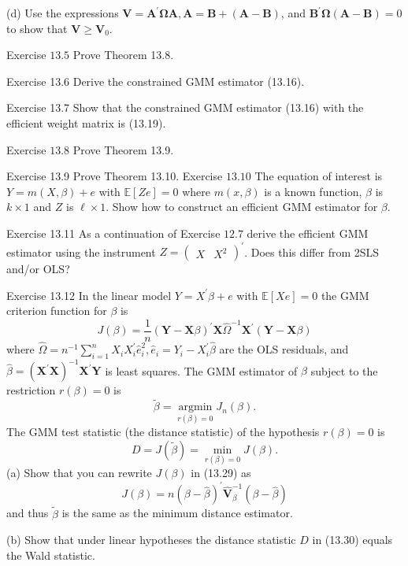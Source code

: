 \documentclass[10pt]{article}
\begin{document}
(d) Use the expressions $\boldsymbol{V}=\boldsymbol{A}^{\prime} \mathbf{\Omega} \boldsymbol{A}, \boldsymbol{A}=\boldsymbol{B}+(\boldsymbol{A}-\boldsymbol{B})$, and $\boldsymbol{B}^{\prime} \boldsymbol{\Omega}(\boldsymbol{A}-\boldsymbol{B})=0$ to show that $\boldsymbol{V} \geq \boldsymbol{V}_{0}$.

Exercise $13.5$ Prove Theorem 13.8.

Exercise 13.6 Derive the constrained GMM estimator (13.16).

Exercise 13.7 Show that the constrained GMM estimator (13.16) with the efficient weight matrix is (13.19).

Exercise $13.8$ Prove Theorem 13.9.

Exercise 13.9 Prove Theorem 13.10. Exercise $13.10$ The equation of interest is $Y=m(X, \beta)+e$ with $\mathbb{E}[Z e]=0$ where $m(x, \beta)$ is a known function, $\beta$ is $k \times 1$ and $Z$ is $\ell \times 1$. Show how to construct an efficient GMM estimator for $\beta$.

Exercise 13.11 As a continuation of Exercise $12.7$ derive the efficient GMM estimator using the instrument $Z=\left(\begin{array}{ll}X & X^{2}\end{array}\right)^{\prime}$. Does this differ from 2SLS and/or OLS?

Exercise 13.12 In the linear model $Y=X^{\prime} \beta+e$ with $\mathbb{E}[X e]=0$ the GMM criterion function for $\beta$ is
$$
J(\beta)=\frac{1}{n}(\boldsymbol{Y}-\boldsymbol{X} \beta)^{\prime} \boldsymbol{X} \widehat{\Omega}^{-1} \boldsymbol{X}^{\prime}(\boldsymbol{Y}-\boldsymbol{X} \beta)
$$
where $\widehat{\Omega}=n^{-1} \sum_{i=1}^{n} X_{i} X_{i}^{\prime} \widehat{e}_{i}^{2}, \widehat{e}_{i}=Y_{i}-X_{i}^{\prime} \widehat{\beta}$ are the OLS residuals, and $\widehat{\beta}=\left(\boldsymbol{X}^{\prime} \boldsymbol{X}\right)^{-1} \boldsymbol{X}^{\prime} \boldsymbol{Y}$ is least squares. The GMM estimator of $\beta$ subject to the restriction $r(\beta)=0$ is
$$
\widetilde{\beta}=\underset{r(\beta)=0}{\operatorname{argmin}} J_{n}(\beta) .
$$
The GMM test statistic (the distance statistic) of the hypothesis $r(\beta)=0$ is
$$
D=J(\tilde{\beta})=\min _{r(\beta)=0} J(\beta) .
$$
(a) Show that you can rewrite $J(\beta)$ in (13.29) as
$$
J(\beta)=n(\beta-\widehat{\beta})^{\prime} \widehat{\boldsymbol{V}}_{\beta}^{-1}(\beta-\widehat{\beta})
$$
and thus $\widetilde{\beta}$ is the same as the minimum distance estimator.

(b) Show that under linear hypotheses the distance statistic $D$ in (13.30) equals the Wald statistic.
\end{document}
